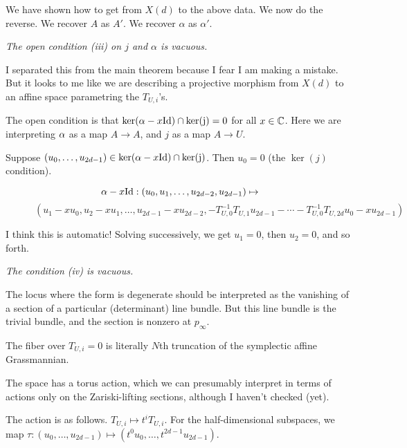 {\bpf
We have shown how to get from $X(d)$ to the above data.  We now do the reverse.
We recover $A$ as $A'$.  We recover $\alpha$ as $\alpha'$.  \epf


 {\em The open condition (iii) on
  $j$ and $\alpha$  is vacuous.}

I separated this from the main theorem because I fear I am making
a mistake.  But it looks to me like we are describing a projective
morphism from $X(d)$ to an affine space parametring the $T_{U,i}$'s.

\bpf
The open condition is that $\ker(\alpha -x \rm{Id}) \cap \ker(j) =0$
for all $x \in \mathbb{C}$.  Here we are interpreting $\alpha$ as a map $A \rightarrow A$,
and $j$ as a map $A \rightarrow U$.

Suppose $(u_0, \dots, u_{2d-1}) \in \ker(\alpha -x \rm{Id}) \cap \ker(j)$.
Then $u_0=0$ (the $\ker(j)$ condition).

$${\alpha-x\rm{Id}}: (u_0, u_1, \dots, u_{2d-2}, u_{2d-1}) \mapsto$$
$$ \quad \quad \quad
 (u_1-xu_0, u_2-xu_1, \dots, u_{2d-1} - x u_{2d-2},
 -T^{-1}_{U,0} T_{U,1} u_{2d-1}  - \cdots  -T^{-1}_{U,0} T_{U,2d} u_0 -xu_{2d-1})$$

 I think this is automatic!  Solving successively, we get $u_1=0$, then $u_2=0$, and so forth.

 \epf


 {\em The condition (iv) is vacuous.}

\bpf  The locus where the form is degenerate should be interpreted as the vanishing of a section of a particular (determinant) line bundle.  But this line bundle is the trivial bundle, and the section is nonzero at $p_\infty$. \epf

 The fiber over $T_{U,i}=0$ is literally $N$th truncation of the symplectic affine Grassmannian.


The space has a torus action, which we can presumably interpret in terms
of actions only on the Zariski-lifting sections, although I haven't checked (yet).

The action is as follows.  $T_{U,i} \mapsto t^i T_{U,i}$.
For the half-dimensional subspaces,
we map $\tau: (u_0, \dots, u_{2d-1}) \mapsto (t^0 u_0, \dots, t^{2d-1} u_{2d-1})$.

}
